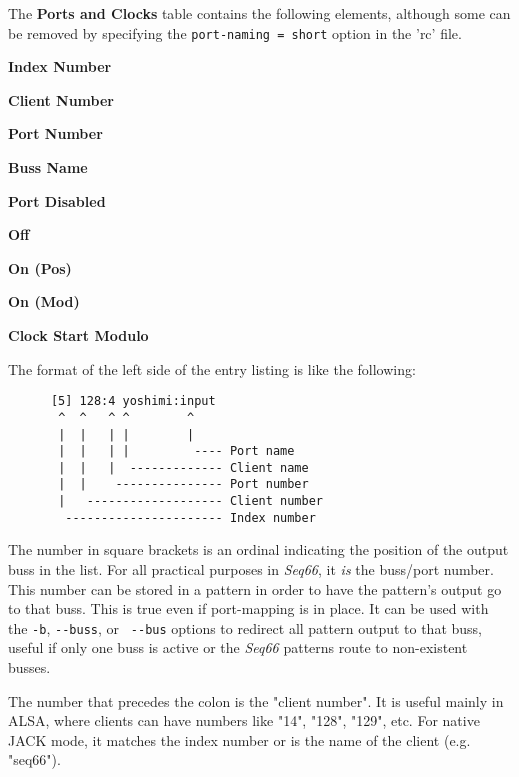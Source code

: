    The \textbf{Ports and Clocks} table contains the following elements,
   although some can be removed by specifying the
   \texttt{port-naming = short} option in the 'rc' file.

   \begin{enumber}
      \item \textbf{Index Number}
      \item \textbf{Client Number}
      \item \textbf{Port Number}
      \item \textbf{Buss Name}
      \item \textbf{Port Disabled}
      \item \textbf{Off}
      \item \textbf{On (Pos)}
      \item \textbf{On (Mod)}
      \item \textbf{Clock Start Modulo}
   \end{enumber}

   The format of the left side of the entry listing is like the following:

   \begin{verbatim}
      [5] 128:4 yoshimi:input
       ^  ^   ^ ^        ^
       |  |   | |        |
       |  |   | |         ---- Port name
       |  |   |  ------------- Client name
       |  |    --------------- Port number
       |   ------------------- Client number
        ---------------------- Index number
   \end{verbatim}

   \setcounter{ItemCounter}{0}      %

   The number in square brackets is an ordinal indicating the position
   of the output buss in the list.
   For all practical purposes in \textsl{Seq66}, it \textsl{is} the
   buss/port number.  This number can be stored in a pattern in order to have
   the pattern's output go to that buss.  
   This is true even if port-mapping is in place.
   It can be used with the \texttt{-b},
   \texttt{-{}-buss}, or \texttt{ -{}-bus} options to redirect all
   pattern output to that buss, useful if only one buss is active or the
   \textsl{Seq66} patterns route to non-existent busses.

   The number that precedes the colon is the "client number".
   It is useful mainly in ALSA, where clients can have numbers like "14",
   "128", "129", etc.  For native JACK mode, it matches the index number or is
   the name of the client (e.g. "seq66").

